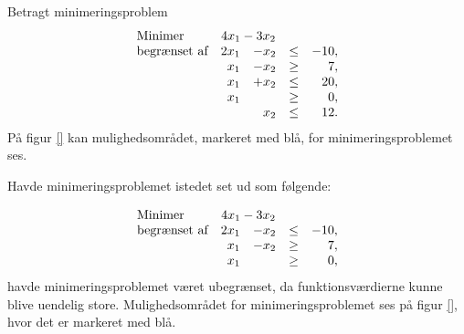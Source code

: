 \begin{eks}
Betragt minimeringsproblem
%
\begin{align*}
\begin{array}{lrrlr}
\text{Minimer}		&	\multicolumn{2}{c}{4x_1-3x_2}  &\\
\text{begrænset af}	&2x_1& - x_2			&\leq 	&-10,\\
					&x_1& - x_2				&\geq	& 7,\\
					&x_1& + x_2				&\leq	& 20,\\
					&x_1&					&\geq	& 0,\\
					& &x_2					&\leq	& 12.
\end{array}
\end{align*}
%
På figur \ref{} kan mulighedsområdet, markeret med blå, for minimeringsproblemet ses.
%

% 
Havde minimeringsproblemet istedet set ud som følgende: 

\begin{align*}
\begin{array}{lrrlr}
\text{Minimer}		&	\multicolumn{2}{c}{4x_1-3x_2}  &\\
\text{begrænset af}	&2x_1& - x_2			&\leq 	&-10,\\
					&x_1& - x_2				&\geq	& 7,\\
					&x_1&					&\geq	& 0,
\end{array}
\end{align*}
havde minimeringsproblemet været ubegrænset, da funktionsværdierne kunne blive uendelig store. 
Mulighedsområdet for minimeringsproblemet ses på figur \ref{}, hvor det er markeret med blå.
%
%
\end{eks}